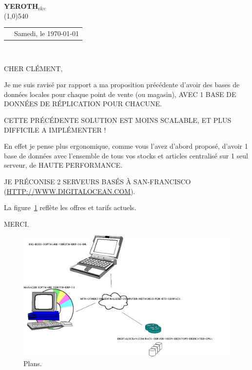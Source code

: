 \documentclass[12pt, a4paper]{article}
\makeatletter
\newcommand{\yerothrc}{\textcolor{yerothColorGreen}
			{\textsc{\textcolor{yerothColorRed}{YEROTH}}$_{\text{r\&c}}$\xspace}}
\newcommand{\headerrow}[2]
{\begin{tabular*}{\linewidth}{l@{\extracolsep{\fill}}r}
	#1 &
	#2 \\
\end{tabular*}}
\makeatother
\begin{document}
\thispagestyle{OnlyFirstPage}

{\bf \Large \yerothrc}
\\ \line(1,0){540}

\vspace{3.5em}

\headerrow
{}
{Samedi, le \today}\\

\vspace{2.5em}


\parbox{\linewidth}{
CHER CL\'EMENT,
\newline

Je me suis ravisé par rapport a ma proposition
précédente d'avoir des bases de données locales
pour chaque point de vente (ou magasin), AVEC 1 
BASE DE DONNÉES DE RÉPLICATION POUR CHACUNE.
\newline

CETTE PRÉCÉDENTE SOLUTION EST MOINS SCALABLE,
ET PLUS DIFFICILE A IMPLÉMENTER !
\newline
}

\parbox{\linewidth}{
En effet je pense plus ergonomique, comme vous 
l'avez d'abord proposé, d'avoir 1 base de
données avec l'ensemble de tous vos stocks et articles
centralisé sur 1 seul serveur, de HAUTE PERFORMANCE.
\newline

JE PRÉCONISE 2 SERVEURS BASÉS À SAN-FRANCISCO
(\url{HTTP://WWW.DIGITALOCEAN.COM}).
\newline

La figure~\ref{fig:plans} refl\`ete les offres
et tarifs actuels.
\newline

MERCI.
\newline
}


\newpage

\begin{figure}
    \includegraphics[scale=0.57]{images/yeroth-erp-sample-customer-decentralized-configuration.pdf}
    \caption{Plans.}
    \label{fig:plans}
\end{figure}
\end{document}
